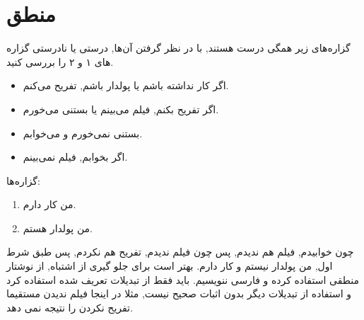 \documentclass[11pt,largemargins]{h2wp}
\begin{document}
\chapter*{منطق}


\question


گزاره‌های زیر همگی درست هستند, با در نظر گرفتن آن‌ها, درستی یا نادرستی گزاره های ۱ و ۲ را بررسی کنید.
\begin{itemize}
\item اگر کار نداشته باشم یا پولدار باشم, تفریح می‌کنم.
\item اگر تفریح بکنم, فیلم می‌بینم یا بستنی می‌خورم.
\item بستنی نمی‌خورم و می‌خوابم.
\item اگر بخوابم, فیلم نمی‌بینم.
\end{itemize}
گزاره‌ها:
\begin{enumerate}
\item من کار دارم.
\item من پولدار هستم.
\end{enumerate}
\solution
چون خوابیدم, فیلم هم ندیدم, پس چون فیلم ندیدم, تفریح هم نکردم, پس طبق شرط اول, من پولدار نیستم و کار دارم.
\notes
{} بهتر است برای جلو گیری از اشتباه, از نوشتار منطقی استفاده کرده و فارسی ننویسیم.
 باید فقط از تبدیلات تعریف شده استفاده کرد و استفاده از تبدیلات دیگر بدون اثبات صحیح نیست, مثلا در اینجا فیلم ندیدن مستقیما تفریح نکردن را نتیجه نمی دهد.
 
\end{document}
